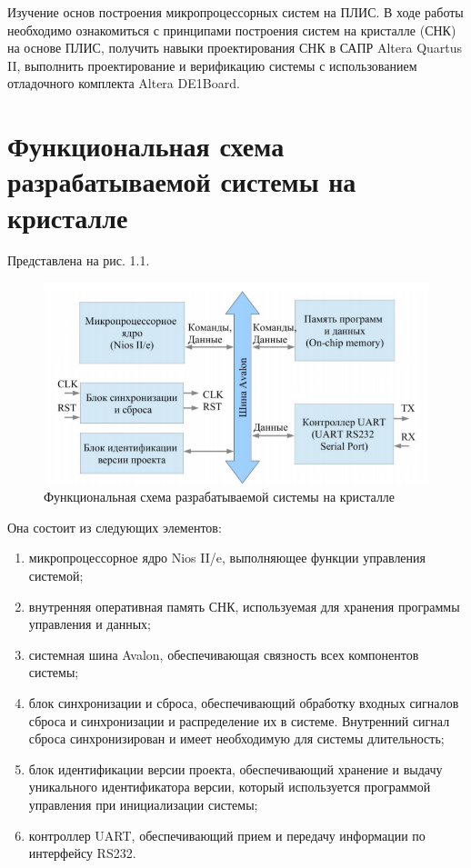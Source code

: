 \setcounter{page}{2}


Изучение основ построения микропроцессорных систем на ПЛИС. В
ходе работы необходимо ознакомиться с принципами построения систем
на кристалле (СНК) на основе ПЛИС, получить навыки проектирования
СНК в САПР Altera Quartus II, выполнить проектирование и верификацию
системы с использованием отладочного комплекта Altera DE1Board.

\chapter{Функциональная схема разрабатываемой системы на кристалле}

Представлена на рис. 1.1.
\begin{figure}[H]
	\begin{center}
		\includegraphics[scale=0.6]{assets/scheme.png}
	\end{center}
	\caption{Функциональная схема разрабатываемой системы на кристалле}
\end{figure}

Она состоит из следующих элементов:
\begin{enumerate}
	\item микропроцессорное ядро Nios II/e, выполняющее функции управления системой;
	\item внутренняя оперативная память СНК, используемая для хранения программы управления и данных;
	\item системная шина Avalon, обеспечивающая связность всех компонентов системы;
	\item блок синхронизации и сброса, обеспечивающий обработку входных сигналов сброса и синхронизации и распределение их в системе. Внутренний сигнал сброса синхронизирован и имеет необходимую для системы длительность;
	\item блок идентификации версии проекта, обеспечивающий хранение и выдачу уникального идентификатора версии, который используется программой управления при инициализации системы;
	\item контроллер UART, обеспечивающий прием и передачу информации по интерфейсу RS232.
\end{enumerate}


